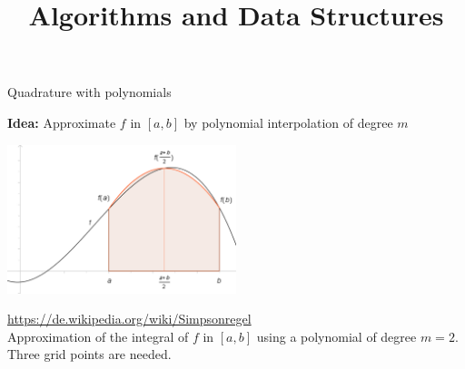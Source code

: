 \documentclass[11pt,compress,t,notes=noshow, xcolor=table]{beamer}
\title{Algorithms and Data Structures}
\begin{document}


\begin{vbframe}{Quadrature with polynomials}

\textbf{Idea:} Approximate $f$ in $[a, b]$ by polynomial interpolation of degree $m$

\begin{center}
\includegraphics[width=0.5\textwidth]{figure_man/newton_cotes_2.png}
\begin{footnotesize}
\url{https://de.wikipedia.org/wiki/Simpsonregel}\\
Approximation of the integral of $f$ in $[a, b]$ using a polynomial of degree $m = 2$. Three grid points are needed.
\end{footnotesize}
\end{center}

\end{vbframe}
\end{document}

